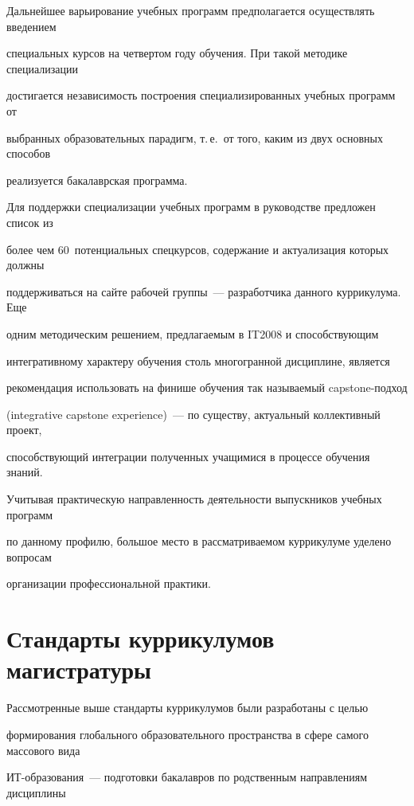 Дальнейшее варьирование учебных программ предполагается осуществлять введением 

специальных курсов на четвертом году обучения. При такой методике специализации 

достигается независимость построения специализированных учебных программ от 

выбранных образовательных парадигм, т.\,е.\ от того, каким из двух основных способов 

реализуется бакалаврская программа. 



Для поддержки специализации учебных программ в руководстве предложен список из 

более чем 60~потенциальных спецкурсов, содержание и актуализация которых должны 

поддерживаться на сайте рабочей группы~--- разработчика данного куррикулума. Еще 

одним методическим решением, предлагаемым в IT2008 и способствующим 

интегративному характеру обучения столь многогранной дисциплине, является 

рекомендация использовать на финише обучения так называемый capstone-подход 

(integrative capstone experience)~--- по существу, актуальный коллективный проект, 

способствующий интеграции полученных учащимися в процессе обучения знаний.



Учитывая практическую направленность деятельности выпускников учебных программ 

по данному профилю, большое место в рассматриваемом куррикулуме уделено вопросам 

организации профессиональной практики. 



\section{Стандарты куррикулумов магистратуры}

      

      Рассмотренные выше стандарты куррикулумов были разработаны с целью 

формирования глобального образовательного пространства в сфере самого массового вида 

ИТ-обра\-зо\-ва\-ния~--- подготовки бакалавров по родственным на\-прав\-ле\-ни\-ям дисциплины 

